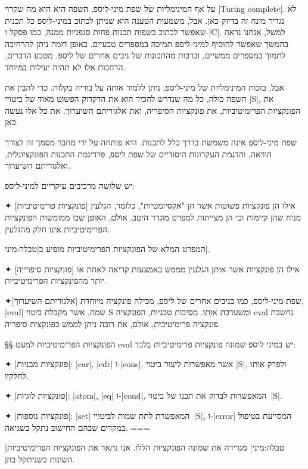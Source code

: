 על אף המינימליות של שפת מיני-ליספ, השפה היא היא מה שקרוי \E|Turing complete|.
לא נגדיר מונח זה בדיוק כאן. אבל, משמעות הטענה היא שניתן לכתוב במיני-ליספ כל
תכנית שאפשר לכתוב בשפות תכנות פחות סגפניות ממנה, כמו פסקל ו-\E|C|. למשל, אנחנו
נראה בהמשך שאפשר להוסיף למיני-ליספ תמיכה במספרים טבעיים. באופן דומה ניתן
להרחיבה לתמוך במספרים ממשיים, וברבות מהתכונות של ניבים אחרים של ליספ. מטבע
הדברים, הרחבות אלו לא תהיה יעילות במיוחד.

אבל, בזכות המינימליות של מיני-ליספ, ניתן ללמוד אותה על בוריה בקלות. כדי להבין
את השפה כולה, כל מה שנדרש להכיר הוא את הדקדוק הפשוט מאוד של ביטויי \E|S|, את
הפונקציות הפרימיטיביות, את פונקציות הסיפריה, ואת אלגוריתם השיערוך. את כל אלו
נעשה כאן.

שפת מיני-ליספ אינה משמשת בדרך כלל לתכנות. היא פותחה על ידי מחבר מסמך זה לצורך
הוראה, והדגמת העקרונות היסודיים של שפת ליספ, פרדיגמת התכנות הפונקציונלית,
ואלגוריתם השיערוך.

יש שלושה מרכיבים עיקריים למיני-ליספ:
\begin{description}
  ✦ [פונקציות פרימיטיביות] אילו הן פונקציות פשוטות אשר הן "אקסיומטיות", כלומר,
  הגלעין מניח שהן קיימות וכי הן מצייתות למפרט מוגדר היטב. אולם, האופן שבו ממומשות
  הפונקציות הפרימיטיביות אינו חלק מהגלעין.

  המפרט המלא של הפונקציות הפרימיטיביות מופיע ב|טבלה:מיני|.

  ✦ [פונקציות סיפרייה] אילו הן פונקציות אשר אותן הגלעין מממש באמצעות קריאה לאחת
  או יותר מהפונקציות הפרימיטיביות.

  ✦[אלגוריתם השיערוך] שפת מיני-ליספ, כמו בניבים אחרים של ליספ, מכילה פונקציה
  מיוחדת, \E|eval| שמה, אשר מקבלת ביטוי S ומשערכת אותו. מסיבות טכניות, הפונקציה
  eval נחשבת פונקציה פרימיטיבית, אולם, את רובה ניתן לממש כפונקצית סיפריה.
\end{description}

§§ הפונקציות הפרימיטיביות
למעט eval יש במיני ליספ שמונה פונקציות פרימיטיביות בלבד:

✦ \ע|פונקציות מבניות|: \E|car|, \E|cdr| ו-\E|cons|, אשר מאפשרות ליצור ביטוי
\E|S|, ולפרק אותו לחלקיו.

✦ \ע|פונקציות לוגיות|: \E|atom|, \E|eq| ו-\E|cond|, המאפשרות לבדוק את תכנו של
ביטוי~\E|S|.

✦ \ע|פונקציות נוספות|: \E|set| המאפשרת לתת שמות לביטויי~\E|S|, ו-\E|error|
המסייעת בטיפול במקרים שבהם החישוב נתקל בשגיאה.
===

|טבלה:מיני| מגדירה את שמונה הפונקציות הללו. אנו נתאר את הפונקציות הפרימיטיביות השונות כשניתקל בהן.

